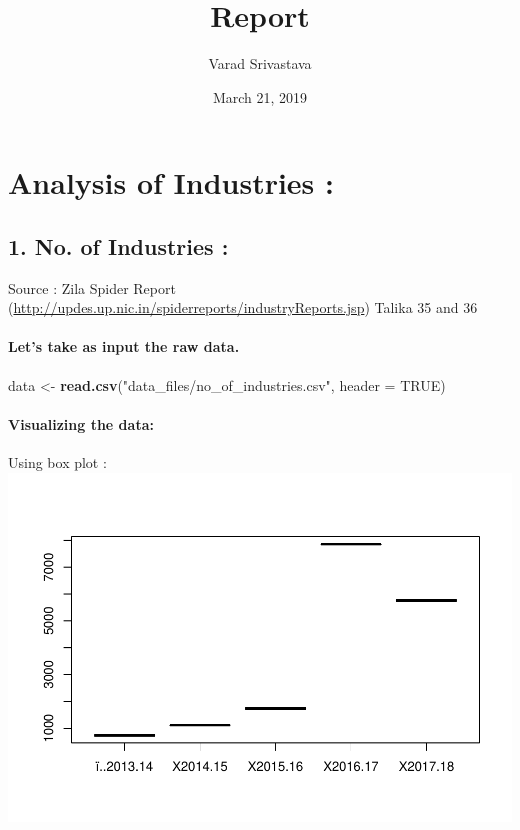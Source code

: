 \documentclass[]{article}
\title{Report}
\author{Varad Srivastava}
\date{March 21, 2019}
\newenvironment{Shaded}{\begin{snugshade}}{\end{snugshade}}
\newcommand{\KeywordTok}[1]{\textcolor[rgb]{0.13,0.29,0.53}{\textbf{#1}}}
\newcommand{\DataTypeTok}[1]{\textcolor[rgb]{0.13,0.29,0.53}{#1}}
\newcommand{\StringTok}[1]{\textcolor[rgb]{0.31,0.60,0.02}{#1}}
\newcommand{\OtherTok}[1]{\textcolor[rgb]{0.56,0.35,0.01}{#1}}
\newcommand{\NormalTok}[1]{#1}
\let\oldparagraph\paragraph
\renewcommand{\paragraph}[1]{\oldparagraph{#1}\mbox{}}
\begin{document}
\maketitle

\section{Analysis of Industries :}\label{analysis-of-industries}

\subsection{1. No. of Industries :}\label{no.-of-industries}

Source : Zila Spider Report
(\url{http://updes.up.nic.in/spiderreports/industryReports.jsp}) Talika
35 and 36

\paragraph{Let's take as input the raw
data.}\label{lets-take-as-input-the-raw-data.}

\begin{Shaded}
\begin{Highlighting}[]
\NormalTok{data <-}\StringTok{ }\KeywordTok{read.csv}\NormalTok{(}\StringTok{"data_files/no_of_industries.csv"}\NormalTok{, }\DataTypeTok{header =} \OtherTok{TRUE}\NormalTok{)}
\end{Highlighting}
\end{Shaded}

\paragraph{Visualizing the data:}\label{visualizing-the-data}

Using box plot :
\includegraphics{Report_files/figure-latex/unnamed-chunk-2-1.pdf}
\end{document}
